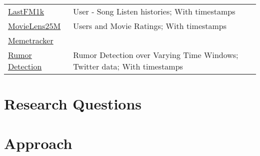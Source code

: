 \documentclass[
acmsmall,
nonacm,
screen,
acmthm]{../../scripts/pandoc/templates/acmart}
\makeatletter
\newcounter{tableno}
\newenvironment{tablenos:no-prefix-table-caption}{
  \caption@ifcompatibility{}{
    \let\oldthetable\thetable
    \let\oldtheHtable\theHtable
    \renewcommand{\thetable}{tableno:\thetableno}
    \renewcommand{\theHtable}{tableno:\thetableno}
    \stepcounter{tableno}
    \captionsetup{labelformat=empty}
  }
}{
  \caption@ifcompatibility{}{
    \captionsetup{labelformat=default}
    \let\thetable\oldthetable
    \let\theHtable\oldtheHtable
    \addtocounter{table}{-1}
  }
}
\makeatother
\begin{document}
\begin{tablenos:no-prefix-table-caption}
\begin{longtable}[]{@{}
  >{\raggedright\arraybackslash}p{}
  >{\raggedright\arraybackslash}p{}@{}}
\href{http://ocelma.net/MusicRecommendationDataset/lastfm-1K.html}{LastFM1k}
& User - Song Listen histories; With timestamps \\
\href{https://grouplens.org/datasets/movielens/25m/}{MovieLens25M} &
Users and Movie Ratings; With timestamps \\
\href{https://snap.stanford.edu/data/memetracker9.html}{Memetracker}
& \\
\href{https://journals.plos.org/plosone/article?id=10.1371/journal.pone.0168344}{Rumor
Detection} & Rumor Detection over Varying Time Windows; Twitter data;
With timestamps \\
\bottomrule
\end{longtable}

\end{tablenos:no-prefix-table-caption}

\hypertarget{research-questions}{%
\section{Research Questions}\label{research-questions}}

\hypertarget{approach}{%
\section{Approach}\label{approach}}

\renewcommand\refname{Planning}

\end{document}

